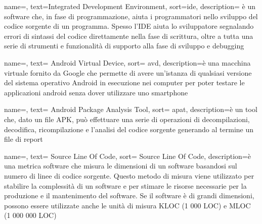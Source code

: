 
{
name=,
text=Integrated Development Environment,
sort=ide,
description={ è un software che, in fase di programmazione, aiuta i programmatori nello sviluppo del codice sorgente di un programma.
Spesso l’IDE aiuta lo sviluppatore segnalando errori di sintassi del codice direttamente nella fase di scrittura, oltre a tutta una serie di strumenti e funzionalità di supporto alla fase di sviluppo e debugging}
}


{
name=,
text= Android Virtual Device,
sort= avd,
description={è una macchina virtuale fornito da Google che permette di avere un'istanza di qualsiasi versione del sistema operativo Android in esecuzione nei computer per poter testare le applicazioni android senza dover utilizzare uno smartphone}
}


{
name=,
text= Android Package Analysis Tool,
sort= apat,
description={è un tool che, dato un file APK, può effettuare una serie di operazioni di decompilazioni, decodifica, ricompilazione e l'analisi del codice sorgente generando al termine un file di report}
}


{
name=,
text= Source Line Of Code,
sort= Source Line Of Code,
description={è una metrica software che misura le dimensioni di un software basandosi sul numero di linee di codice sorgente.
Questo metodo di misura viene utilizzato per stabilire la complessità di un software e per stimare le risorse necessarie per la produzione e il mantenimento del software.
Se il software è di grandi dimensioni, possono essere utilizzate anche le unità di misura KLOC (1 000 LOC) e MLOC (1 000 000 LOC)}
}

